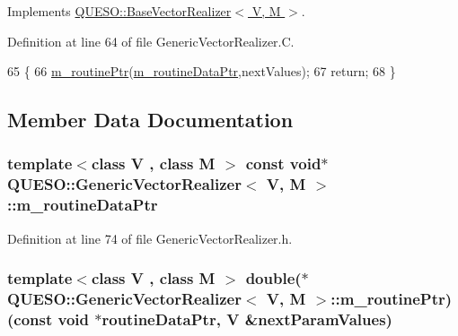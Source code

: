 Implements \hyperlink{class_q_u_e_s_o_1_1_base_vector_realizer_a6845173dd79a80ae11c86cde26e55817}{Q\-U\-E\-S\-O\-::\-Base\-Vector\-Realizer$<$ V, M $>$}.



Definition at line 64 of file Generic\-Vector\-Realizer.\-C.


\begin{DoxyCode}
65 \{
66   \hyperlink{class_q_u_e_s_o_1_1_generic_vector_realizer_a913da22606696da4831afc3ef47a3a76}{m\_routinePtr}(\hyperlink{class_q_u_e_s_o_1_1_generic_vector_realizer_ad2c00300197c0a97bc43b55ea25c16cd}{m\_routineDataPtr},nextValues);
67   \textcolor{keywordflow}{return};
68 \}
\end{DoxyCode}


\subsection{Member Data Documentation}
\hypertarget{class_q_u_e_s_o_1_1_generic_vector_realizer_ad2c00300197c0a97bc43b55ea25c16cd}{
\subsubsection[{m\-\_\-routine\-Data\-Ptr}]{\setlength{\rightskip}{0pt plus 5cm}template$<$class V , class M $>$ const void$\ast$ {\bf Q\-U\-E\-S\-O\-::\-Generic\-Vector\-Realizer}$<$ V, M $>$\-::m\-\_\-routine\-Data\-Ptr\hspace{0.3cm}{\ttfamily [private]}}}\label{class_q_u_e_s_o_1_1_generic_vector_realizer_ad2c00300197c0a97bc43b55ea25c16cd}


Definition at line 74 of file Generic\-Vector\-Realizer.\-h.

\hypertarget{class_q_u_e_s_o_1_1_generic_vector_realizer_a913da22606696da4831afc3ef47a3a76}{
\subsubsection[{m\-\_\-routine\-Ptr}]{\setlength{\rightskip}{0pt plus 5cm}template$<$class V , class M $>$ double($\ast$ {\bf Q\-U\-E\-S\-O\-::\-Generic\-Vector\-Realizer}$<$ V, M $>$\-::m\-\_\-routine\-Ptr)(const void $\ast$routine\-Data\-Ptr, V \&next\-Param\-Values)\hspace{0.3cm}{\ttfamily [private]}}}\label{class_q_u_e_s_o_1_1_generic_vector_realizer_a913da22606696da4831afc3ef47a3a76}


